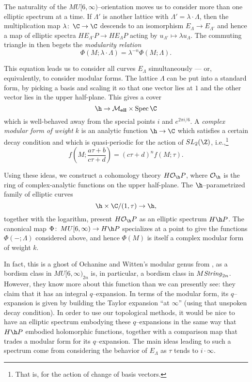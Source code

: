 \begin{example}
The naturality of the $MU[6, \infty)$--orientation moves us to consider more than one elliptic spectrum at a time.  If $\Lambda'$ is another lattice with $\Lambda' = \lambda \cdot \Lambda$, then the multiplication map $\lambda\co \C \to \C$ descends to an isomorphism $E_\Lambda \to E_{\Lambda'}$ and hence a map of elliptic spectra $HE_{\Lambda'}P \to HE_\Lambda P$ acting by $u_{\Lambda'} \mapsto \lambda u_\Lambda$.  The commuting triangle in  then begets the \emph{modularity relation} \[\Phi(M; \lambda \cdot \Lambda) = \lambda^{-n} \Phi(M; \Lambda).\]
\end{example}

\begin{example}\label{OrdinaryHomologyInUpperHalfPlaneEx}
This equation leads us to consider all curves $E_\Lambda$ simultaneously --- or, equivalently, to consider modular forms.  The lattice $\Lambda$ can be put into a standard form, by picking a basis and scaling it so that one vector lies at $1$ and the other vector lies in the upper half-plane.  This gives a cover \[\h \to \moduli{ell} \times \Spec \C\] which is well-behaved away from the special points $i$ and $e^{2 \pi i / 6}$.  A \textit{complex modular form of weight $k$} is an analytic function $\h \to \C$ which satisfies a certain decay condition and which is quasi-periodic for the action of $SL_2(\Z)$, i.e.,\footnote{That is, for the action of change of basis vectors.} \[f\left(M; \frac{a \tau + b}{c \tau + d} \right) = (c \tau + d)^n f(M; \tau).\]

Using these ideas, we construct a cohomology theory $H \sheaf O_{\h} P$, where $\sheaf O_{\h}$ is the ring of complex-analytic functions on the upper half-plane.  The $\h$--parametrized family of elliptic curves \[\h \times \C / (1, \tau) \to \h,\] together with the logarithm, present $H \sheaf O_{\h} P$ as an elliptic spectrum $H\h P$.  The canonical map $\Phi\co MU[6, \infty) \to H\h P$ specializes at a point to give the functions $\Phi(-; \Lambda)$ considered above, and hence $\Phi(M)$ is itself a complex modular form of weight $k$.
\end{example}

In fact, this is a ghost of Ochanine and Witten's modular genus from , as a bordism class in $MU[6, \infty)_{2n}$ is, in particular, a bordism class in $M\mathit{String}_{2n}$.  However, they know more about this function than we can presently see: they claim that it has an integral $q$--expansion.  In terms of the modular form, its $q$--expansion is given by building the Taylor expansion ``at $\infty$'' (using that unspoken decay condition).  In order to use our topological methods, it would be nice to have an elliptic spectrum embodying these $q$--expansions in the same way that $H\h P$ embodied holomorphic functions, together with a comparison map that trades a modular form for its $q$--expansion.  The main ideas leading to such a spectrum come from considering the behavior of $E_\Lambda$ as $\tau$ tends to $i \cdot \infty$.

